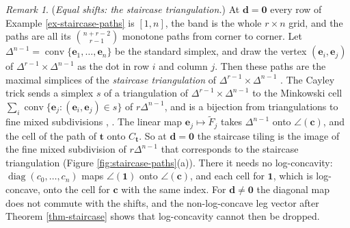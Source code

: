 \documentclass[11pt, a4paper, abstract=yes]{scrartcl}
\theoremstyle{definition}
\theoremstyle{remark}
\newtheorem{remark}[definition]{Remark}
\theoremstyle{plain}
\newcommand{\vek}[1]{\boldsymbol{#1}}
\theoremstyle{remark}
\theoremstyle{plain}
\newcommand{\conv}{\operatorname{conv}}
\newcommand{\rasimp}{\angle}
\let\autocite\cite
\begin{document}
\begin{remark}
(\emph{Equal shifts: the staircase triangulation.}) At \(\vek d=\vek 0\) every row of
Example \ref{ex-staircase-paths} is \([1,n]\), the band is the whole \(r\times n\) grid, and the paths
are all its \(\binom{n+r-2}{r-1}\) monotone paths from corner to corner. Let
\(\Delta^{n-1}=\conv\lbrace\vek e_1,\dots,\vek e_n\rbrace\) be the standard simplex, and draw the
vertex \((\vek e_i,\vek e_j)\) of \(\Delta^{r-1}\times\Delta^{n-1}\) as the dot in row \(i\) and
column \(j\). Then these paths are the maximal simplices of the \emph{staircase triangulation} of
\(\Delta^{r-1}\times\Delta^{n-1}\) \autocite[Example 2.2]{CeballosPadrolSarmiento2015}. The Cayley
trick sends a simplex \(s\) of a triangulation of \(\Delta^{r-1}\times\Delta^{n-1}\) to the
Minkowski cell \(\sum_i\conv\lbrace\vek e_j:(\vek e_i,\vek e_j)\in s\rbrace\) of \(r\Delta^{n-1}\),
and is a bijection from triangulations to fine mixed subdivisions \cite[Theorem 1.4 and
Section 1.4]{Santos2005}, \cite[Section 2]{CeballosPadrolSarmiento2015}. The linear map \(\vek e_j\mapsto\tilde F_j\)
takes \(\Delta^{n-1}\) onto \(\rasimp(\vek c)\), and the cell of the path of \(\vek t\) onto
\(C_{\vek t}\). So at \(\vek d=\vek 0\) the staircase tiling is the image of the fine mixed
subdivision of \(r\Delta^{n-1}\) that corresponds to the staircase triangulation
(Figure \ref{fig:staircase-paths}(a)). There it needs no log-concavity:
\(\operatorname{diag}(c_0,\dots,c_n)\) maps \(\rasimp(\vek 1)\) onto \(\rasimp(\vek c)\), and each
cell for \(\vek 1\), which is log-concave, onto the cell for \(\vek c\) with the same index. For
\(\vek d\ne\vek 0\) the diagonal map does not commute with the shifts, and the non-log-concave
leg vector after Theorem \ref{thm-staircase} shows that log-concavity cannot then be dropped.
\label{rem-staircase-cayley}
\end{remark}
\end{document}
